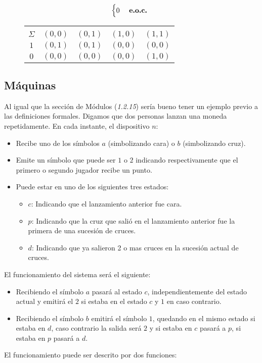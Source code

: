 \begin{itemize}
\begin{align*}
\begin{cases}
0 & \text{ \textbf{e.o.c.} }
\end{cases}
\end{align*}
\begin{figure}[ht!]
\centering
\begin{tabular}{|c|cccc|}
    \hline
    \backslashbox{$k$}{\vspace{0.1pt}\\$\Sigma$} & $(0,0)$ & $(0,1)$ & $(1,0)$ & $(1,1)$ \\ \hline
                $1$ & $(0,1)$ & $(0,1)$ & $(0,0)$  & $(0,0)$  \\ 
                $0$ & $(0,0)$ & $(0,0)$ & $(0,0)$  & $(1,0)$  \\ \hline
\end{tabular} 
\end{figure}
\end{itemize}
\subsection{Máquinas}
Al igual que la sección de Módulos (\textit{1.2.15}) sería bueno tener un ejemplo previo a las definiciones formales. Digamos que dos personas lanzan una moneda repetidamente. En cada instante, el dispositivo $n$:
\begin{itemize}
\item Recibe uno de los símbolos $a$ (simbolizando cara) o $b$ (simbolizando cruz).
\item Emite un símbolo que puede ser $1$ o $2$ indicando respectivamente que el primero o segundo jugador recibe un punto.
\item Puede estar en uno de los siguientes tres estados:
\begin{itemize}
\item $c$: Indicando que el lanzamiento anterior fue cara.
\item $p$: Indicando que la cruz que salió en el lanzamiento anterior fue la primera de una sucesión de cruces.
\item $d$: Indicando que ya salieron 2 o mas cruces en la sucesión actual de cruces.
\end{itemize}
\end{itemize}
El funcionamiento del sistema será el siguiente:
\begin{itemize}
\item Recibiendo el símbolo $a$ pasará al estado $c$, independientemente del estado actual y emitirá el $2$ si estaba en el estado $c$ y $1$ en caso contrario.
\item Recibiendo el símbolo $b$ emitirá el símbolo $1$, quedando en el mismo estado si estaba en $d$, caso contrario la salida será $2$ y si estaba en $c$ pasará a $p$, si estaba en $p$ pasará a $d$.
\end{itemize}
El funcionamiento puede ser descrito por dos funciones:

